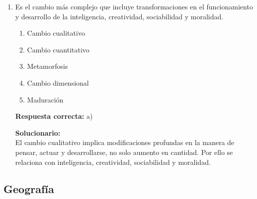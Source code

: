 \begin{enumerate}
	\vspace{2mm}
	\textbf{Solucionario:}\\
	La epistemología estudia la naturaleza, origen y validez del conocimiento científico.
	
	\vspace{6mm}
	
	\item Es el cambio más complejo que incluye transformaciones en el funcionamiento y desarrollo de la inteligencia, creatividad, sociabilidad y moralidad.
	\begin{enumerate}[label=\alph*)]
		\item Cambio cualitativo
		\item Cambio cuantitativo
		\item Metamorfosis
		\item Cambio dimensional
		\item Maduración
	\end{enumerate}
	\textbf{Respuesta correcta:} a)
	
	\vspace{2mm}
	\textbf{Solucionario:}\\
	El cambio cualitativo implica modificaciones profundas en la manera de pensar, actuar y desarrollarse, no solo aumento en cantidad. Por ello se relaciona con inteligencia, creatividad, sociabilidad y moralidad.
	
	\vspace{6mm}
	
\end{enumerate}

\subsection*{Geografía}

